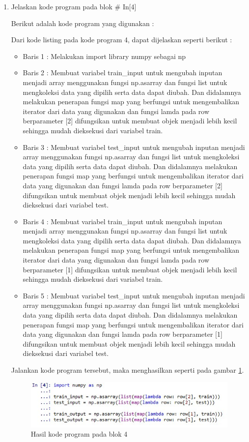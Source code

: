\begin{enumerate}
\item Jelaskan kode program pada blok \# In[4]
	\par Berikut adalah kode program yang digunakan :
	
	\par Dari kode listing pada kode program 4, dapat dijelaskan seperti berikut :
	\begin{itemize}
	\item Baris 1	: Melakukan import library numpy sebagai np
	\item Baris 2	: Membuat variabel train\_input untuk mengubah inputan menjadi array menggunakan fungsi np.asarray dan  fungsi list untuk mengkoleksi data yang dipilih serta data dapat diubah. Dan didalamnya melakukan penerapan fungsi map yang berfungsi untuk mengembalikan iterator dari data yang digunakan dan fungsi lamda pada row berparameter [2] difungsikan untuk membuat objek menjadi lebih kecil sehingga mudah dieksekusi dari variabel train.
	\item Baris 3	: Membuat variabel test\_input untuk mengubah inputan menjadi array menggunakan fungsi np.asarray dan  fungsi list untuk mengkoleksi data yang dipilih serta data dapat diubah. Dan didalamnya melakukan penerapan fungsi map yang berfungsi untuk mengembalikan iterator dari data yang digunakan dan fungsi lamda pada row berparameter [2] difungsikan untuk membuat objek menjadi lebih kecil sehingga mudah dieksekusi dari variabel test.
	\item Baris 4	: Membuat variabel train\_input untuk mengubah inputan menjadi array menggunakan fungsi np.asarray dan  fungsi list untuk mengkoleksi data yang dipilih serta data dapat diubah. Dan didalamnya melakukan penerapan fungsi map yang berfungsi untuk mengembalikan iterator dari data yang digunakan dan fungsi lamda pada row berparameter [1] difungsikan untuk membuat objek menjadi lebih kecil sehingga mudah dieksekusi dari variabel train.
	\item Baris 5	: Membuat variabel test\_input untuk mengubah inputan menjadi array menggunakan fungsi np.asarray dan  fungsi list untuk mengkoleksi data yang dipilih serta data dapat diubah. Dan didalamnya melakukan penerapan fungsi map yang berfungsi untuk mengembalikan iterator dari data yang digunakan dan fungsi lamda pada row berparameter [1] difungsikan untuk membuat objek menjadi lebih kecil sehingga mudah dieksekusi dari variabel test.
	\end{itemize}
	\par Jalankan kode program tersebut, maka menghasilkan seperti pada gambar \ref{andri4}.
		\begin{figure}[!hbtp]
		\centering
		\includegraphics[scale=0.5]{figures/chapter7/andri4.jpg}
		\caption{Hasil kode program pada blok 4}
		\label{andri4}
		\end{figure}
	

\end{enumerate}
